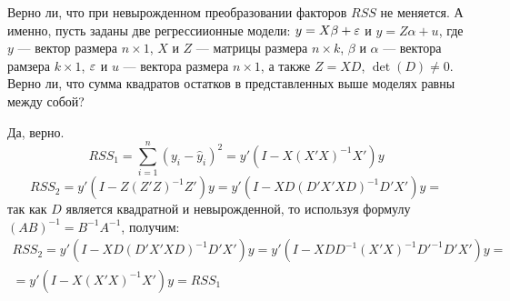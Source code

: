 \begin{problem}
Верно ли, что при невырожденном преобразовании факторов $RSS$ не меняется. А именно, пусть заданы две регрессиионные модели: $y = X\beta + \varepsilon$ и $y = Z\alpha + u$, где $y$ --- вектор размера $n \times 1$, $X$ и $Z$ --- матрицы размера $n \times k$, $\beta$ и $\alpha$ --- вектора рамзера $k \times 1$, $\varepsilon$ и $u$ --- вектора размера $n \times 1$, а также $Z=XD$, $\det(D) \not= 0.$ Верно ли, что сумма квадратов остатков в представленных выше моделях равны между собой?
\end{problem}
\begin{solution}
Да, верно.
\[RSS_1=\sum_{i=1}^n(y_i-\hat y_i)^2=y'(I-X(X'X)^{-1}X')y\]
\[RSS_2=y'(I-Z(Z'Z)^{-1}Z')y=y'(I-XD(D'X'XD)^{-1}D'X')y=\]
так как $D$ является квадратной и невырожденной, то используя формулу $(AB)^{-1}=B^{-1}A^{-1}$, получим:
\begin{multline*}
RSS_2=y'(I-XD(D'X'XD)^{-1}D'X')y=y'(I-XDD^{-1}(X'X)^{-1}D'^{-1}D'X')y=\\=y'(I-X(X'X)^{-1}X')y=RSS_1
\end{multline*}
\end{solution}


